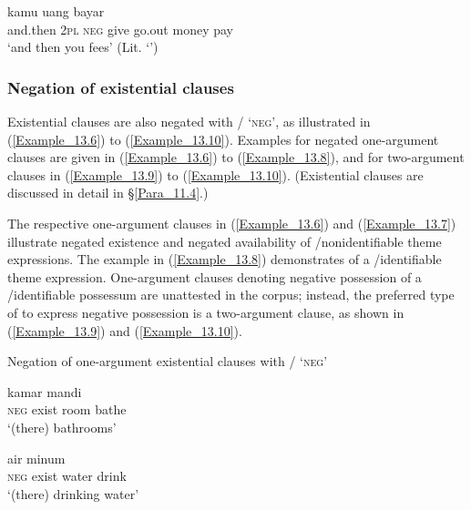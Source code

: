 \ea
\label{Example_13.5}
 {kamu} {} {} {} {uang} {bayar}\\ %
 and.then  \textsc{2pl}  \textsc{neg}  give  go.out  money  pay\\
 ‘and then you  fees’ (Lit. ‘’) \textstyleExampleSource{[081115-001a-Cv.0160]}
\z

\subsubsection[Negation of existential clauses]{Negation of existential clauses}
\label{Para_13.1.1.2}
Existential clauses are also negated with / ‘\textsc{neg}’, as illustrated in (\ref{Example_13.6}) to (\ref{Example_13.10}). Examples for negated one-argument clauses are given in (\ref{Example_13.6}) to (\ref{Example_13.8}), and for two-argument clauses in (\ref{Example_13.9}) to (\ref{Example_13.10}). (Existential clauses are discussed in detail in §\ref{Para_11.4}.)



The respective one-argument clauses in (\ref{Example_13.6}) and (\ref{Example_13.7}) illustrate negated existence and negated availability of /nonidentifiable theme expressions. The example in (\ref{Example_13.8}) demonstrates  of a /identifiable theme expression. One-argument clauses denoting negative possession of a /identifiable possessum are unattested in the corpus; instead, the preferred type of  to express negative possession is a two-argument clause, as shown in (\ref{Example_13.9}) and (\ref{Example_13.10}).


\begin{styleExampleTitle}
Negation of one-argument existential clauses with / ‘\textsc{neg}’
\end{styleExampleTitle}

\ea
\label{Example_13.6}
 {} {kamar} {mandi}\\ %
 \textsc{neg}  exist  room  bathe\\
\glt 
‘(there)  bathrooms’ \textstyleExampleSource{[081025-009a-Cv.0059]}
\z

\ea
\label{Example_13.7}
 {} {air} {minum}\\ %
 \textsc{neg}  exist  water  drink\\
\glt 
‘(there)  drinking water’ \textstyleExampleSource{[081025-009a-Cv.0060]}
\z

